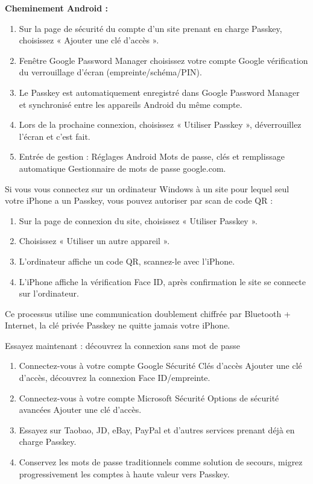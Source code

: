 \textbf{Cheminement Android :}

\begin{enumerate}
  \item Sur la page de sécurité du compte d'un site prenant en charge Passkey, choisissez « Ajouter une clé d'accès ».
  \item Fenêtre Google Password Manager choisissez votre compte Google vérification du verrouillage d'écran (empreinte/schéma/PIN).
  \item Le Passkey est automatiquement enregistré dans Google Password Manager et synchronisé entre les appareils Android du même compte.
  \item Lors de la prochaine connexion, choisissez « Utiliser Passkey », déverrouillez l'écran et c'est fait.
  \item Entrée de gestion : Réglages Android Mots de passe, clés et remplissage automatique Gestionnaire de mots de passe google.com.
\end{enumerate}


Si vous vous connectez sur un ordinateur Windows à un site pour lequel seul votre iPhone a un Passkey, vous pouvez autoriser par scan de code QR :

\begin{enumerate}
  \item Sur la page de connexion du site, choisissez « Utiliser Passkey ».
  \item Choisissez « Utiliser un autre appareil ».
  \item L'ordinateur affiche un code QR, scannez-le avec l'iPhone.
  \item L'iPhone affiche la vérification Face ID, après confirmation le site se connecte sur l'ordinateur.
\end{enumerate}

Ce processus utilise une communication doublement chiffrée par Bluetooth + Internet, la clé privée Passkey ne quitte jamais votre iPhone.

\begin{tcbpractice}{Essayez maintenant : découvrez la connexion sans mot de passe}
\begin{enumerate}
  \item Connectez-vous à votre compte Google Sécurité Clés d'accès Ajouter une clé d'accès, découvrez la connexion Face ID/empreinte.
  \item Connectez-vous à votre compte Microsoft Sécurité Options de sécurité avancées Ajouter une clé d'accès.
  \item Essayez sur Taobao, JD, eBay, PayPal et d'autres services prenant déjà en charge Passkey.
  \item Conservez les mots de passe traditionnels comme solution de secours, migrez progressivement les comptes à haute valeur vers Passkey.
\end{enumerate}

\end{tcbpractice}

